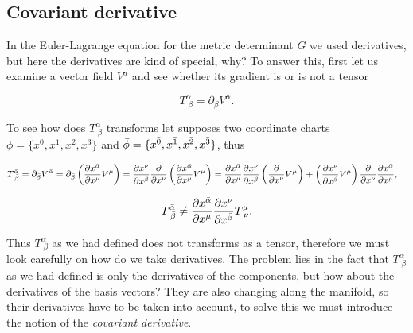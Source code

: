     \subsection{Covariant derivative}

        In the Euler-Lagrange equation for the metric determinant $G$ we used derivatives, but here the derivatives are kind of special, why? To answer this, first let us examine a vector field $V^a$ and see whether its gradient is or is not a tensor

        \begin{equation}
            T^{\alpha}_{\;\beta}=\partial_{\beta}V^{\alpha}.
        \end{equation}

        To see how does $T^{\alpha}_{\;\beta}$ transforms let supposes two coordinate charts $\phi = \{x^0,x^1,x^2,x^3\}$ and $\Bar{\phi} = \{x^{\Bar{0}},x^{\Bar{1}},x^{\Bar{2}},x^{\Bar{3}}\}$, thus

        \begin{align*}
            T^{\Bar{\alpha}}_{\;\Bar{\beta}} &= \partial_{\Bar{\beta}}V^{\Bar{\alpha}} = \partial_{\Bar{\beta}}\left(\frac{\partial x^{\Bar{\alpha}}}{\partial x^{\mu}}V^{\mu}\right) = \frac{\partial x^{\nu}}{\partial x^{\Bar{\beta}}}\frac{\partial}{\partial x^{\nu}}\left(\frac{\partial x^{\Bar{\alpha}}}{\partial x^{\mu}}V^{\mu}\right) = \frac{\partial x^{\Bar{\alpha}}}{\partial x^{\mu}}\frac{\partial x^{\nu}}{\partial x^{\Bar{\beta}}}\left(\frac{\partial}{\partial x^{\nu}}V^{\mu}\right) + \left(\frac{\partial x^{\nu}}{\partial x^{\Bar{\beta}}}V^{\mu}\right)\frac{\partial}{\partial x^{\nu}}\frac{\partial x^{\Bar{\alpha}}}{\partial x^{\mu}},
        \end{align*}

        \begin{equation*}
            T^{\Bar{\alpha}}_{\;\Bar{\beta}} \neq \frac{\partial x^{\Bar{\alpha}}}{\partial x^{\mu}}\frac{\partial x^{\nu}}{\partial x^{\Bar{\beta}}}T^{\mu}_{\;\nu}.
        \end{equation*}

        Thus $T^{\alpha}_{\;\beta}$ as we had defined does not transforms as a tensor, therefore we must look carefully on how do we take derivatives. The problem lies in the fact that $T^{\alpha}_{\;\beta}$ as we had defined is only the derivatives of the components, but how about the derivatives of the basis vectors? They are also changing along the manifold, so their derivatives have to be taken into account, to solve this we must introduce the notion of the \textit{covariant derivative}.

